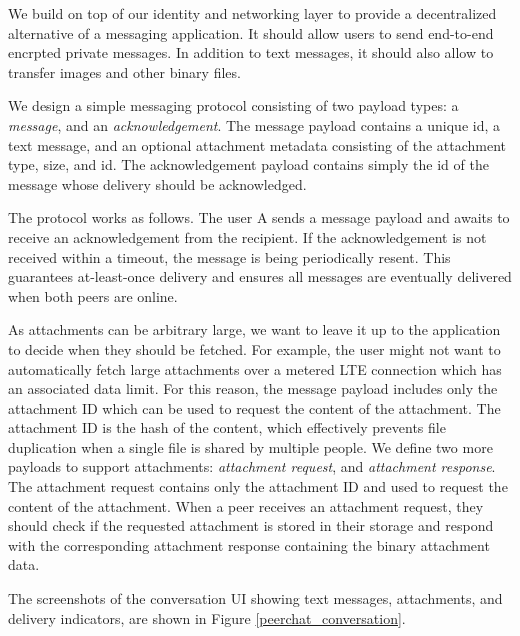 We build on top of our identity and networking layer to provide a decentralized alternative of a messaging application. It should allow users to send end-to-end encrpted private messages. In addition to text messages, it should also allow to transfer images and other binary files.

We design a simple messaging protocol consisting of two payload types: a \textit{message}, and an \textit{acknowledgement}. The message payload contains a unique id, a text message, and an optional attachment metadata consisting of the attachment type, size, and id. The acknowledgement payload contains simply the id of the message whose delivery should be acknowledged.

The protocol works as follows. The user A sends a message payload and awaits to receive an acknowledgement from the recipient. If the acknowledgement is not received within a timeout, the message is being periodically resent. This guarantees at-least-once delivery and ensures all messages are eventually delivered when both peers are online.

As attachments can be arbitrary large, we want to leave it up to the application to decide when they should be fetched. For example, the user might not want to automatically fetch large attachments over a metered LTE connection which has an associated data limit. For this reason, the message payload includes only the attachment ID which can be used to request the content of the attachment. The attachment ID is the hash of the content, which effectively prevents file duplication when a single file is shared by multiple people. We define two more payloads to support attachments: \textit{attachment request}, and \textit{attachment response}. The attachment request contains only the attachment ID and used to request the content of the attachment. When a peer receives an attachment request, they should check if the requested attachment is stored in their storage and respond with the corresponding attachment response containing the binary attachment data.

The screenshots of the conversation UI showing text messages, attachments, and delivery indicators, are shown in Figure \ref{peerchat_conversation}.

